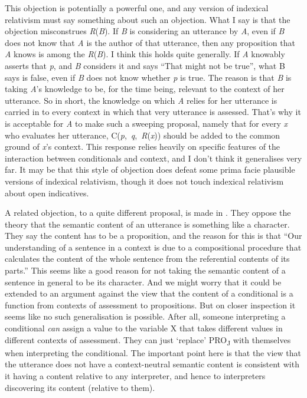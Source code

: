 This objection is potentially a powerful one, and any version of indexical relativism must say something about such an objection. What I say is that the objection misconstrues \textit{R}(\textit{B}). If \textit{B} is considering an utterance by \textit{A}, even if \textit{B} does not know that \textit{A} is the author of that utterance, then any proposition that \textit{A} knows is among the \textit{R}(\textit{B}). I think this holds quite generally. If \textit{A} knowably asserts that \textit{p}, and \textit{B} considers it and says ``That might not be true'', what B says is false, even if \textit{B} does not know whether \textit{p} is true. The reason is that \textit{B} is taking \textit{A}'s knowledge to be, for the time being, relevant to the context of her utterance. So in short, the knowledge on which \textit{A} relies for her utterance is carried in to every context in which that very utterance is assessed. That's why it is acceptable for \textit{A} to make such a sweeping proposal, namely that for every \textit{x} who evaluates her utterance, C(\textit{p},~\textit{q},~\textit{R}(\textit{x})) should be added to the common ground of \textit{x}'s context. This response relies heavily on specific features of the interaction between conditionals and context, and I don't think it generalises very far. It may be that this style of objection does defeat some prima facie plausible versions of indexical relativism, though it does not touch indexical relativism about open indicatives.

A related objection, to a quite different proposal, is made in \citet{KingStanley2005}. They oppose the theory that the semantic content of an utterance is something like a character. They say the content has to be a proposition, and the reason for this is that ``Our understanding of a sentence in a context is due to a compositional procedure that calculates the content of the whole sentence from the referential contents of its parts.'' This seems like a good reason for not taking the semantic content of a sentence in general to be its character. And we might worry that it could be extended to an argument against the view that the content of a conditional is a function from contexts of assessment to propositions. But on closer inspection it seems like no such generalisation is possible. After all, someone interpreting a conditional \textit{can} assign a value to the variable X that takes different values in different contexts of assessment. They can just `replace' PRO\textsubscript{J} with themselves when interpreting the conditional. The important point here is that the view that the utterance does not have a context-neutral semantic content is consistent with it having a content relative to any interpreter, and hence to interpreters discovering its content (relative to them).

